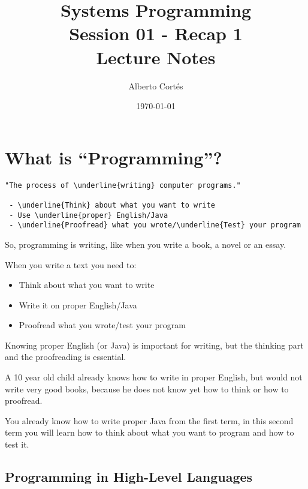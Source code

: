 \documentclass[8pt, a4paper, oneside]{extarticle}
\newcommand{\realtitle}{Session 01 - Recap 1}
\begin{document}
\title{Systems Programming\\\realtitle\\Lecture Notes}
\author{Alberto Cortés}
\date{\today}
\maketitle

\section{What is ``Programming''?}

\begin{multicols}{2}
  \begin{Verbatim}
"The process of \underline{writing} computer programs."

 - \underline{Think} about what you want to write
 - Use \underline{proper} English/Java
 - \underline{Proofread} what you wrote/\underline{Test} your program
  \end{Verbatim}
  \columnbreak

  So, programming is writing,
  like when you write a book, a novel or an essay.

  When you write a text you need to:
  \begin{itemize}
    \item Think about what you want to write
    \item Write it on proper English/Java
    \item Proofread what you wrote/test your program
  \end{itemize}

  Knowing proper English (or Java) is important for writing, but the thinking
  part and the proofreading is essential.

  A 10 year old child already knows how to write in proper English, but would
  not write very good books, because he does not know yet how to think or how
  to proofread.

  You already know how to write proper Java from the first term, in this second
  term you will learn how to think about what you want to program and how to
  test it.
\end{multicols}

\subsection{Programming in High-Level Languages}
\end{document}
